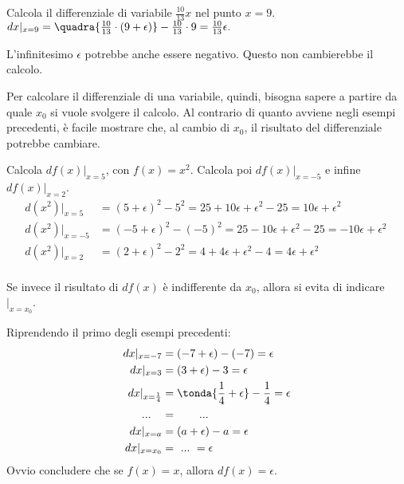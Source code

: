 \begin{esempio}
 Calcola il differenziale di variabile $\frac{10}{13}x$ nel punto $x=9$.\\
 $dx|_{x=9}=\quadra{\frac{10}{13}\cdot(9+\epsilon)}-\frac{10}{13}\cdot 9=\frac{10}{13}\epsilon.$
 \end{esempio}

\begin{osservazione}
 L'infinitesimo $\epsilon$ potrebbe anche essere negativo. Questo non cambierebbe 
 il calcolo.\\
\end{osservazione}

Per calcolare il differenziale di una variabile, quindi, bisogna sapere a partire 
da quale $x_0$ si vuole svolgere il calcolo. Al contrario di quanto avviene negli
esempi precedenti, è facile mostrare che, al cambio di $x_0$, il risultato del 
differenziale potrebbe cambiare.\\

\begin{esempio}
 Calcola $df(x)|_{x=5}$, con $f(x)=x^2$. Calcola poi $df(x)|_{x=-5}$ e infine $df(x)|_{x=2}$.
 \begin{align*} 
  d(x^2)|_{x=5} & =(5+\epsilon)^2-5^2=25+10\epsilon+\epsilon^2-25=10\epsilon+\epsilon^2\\
  d(x^2)|_{x=-5}& =(-5+\epsilon)^2-(-5)^2=25-10\epsilon+\epsilon^2-25=-10\epsilon+\epsilon^2\ \\
  d(x^2)|_{x=2} & =(2+\epsilon)^2-2^2=4+4\epsilon+\epsilon^2-4=4\epsilon+\epsilon^2\\\
 \end{align*}

\end{esempio}

Se invece il risultato di $df(x)$ è indifferente da $x_0$, allora si evita di 
indicare $|_{x=x_0}$. 
\begin{esempio}
 Riprendendo il primo degli esempi precedenti:
 \begin{align*}
  dx|_{x=-7} & =(-7+\epsilon)-(-7)=\epsilon\\
  dx|_{x=3} & =(3+\epsilon)-3=\epsilon\\
  dx|_{x=\frac{1}{4}} &= \tonda{\frac{1}{4}+\epsilon}-\frac{1}{4}=\epsilon\\
  ...\quad &= \qquad ...\\
  dx|_{x=a} & =(a+\epsilon)-a=\epsilon\\
  dx|_{x=x_0} & =\ ...\ =\epsilon\\
 \end{align*}
 Ovvio concludere che se $f(x)=x$, allora $df(x)=\epsilon$.
\end{esempio}




